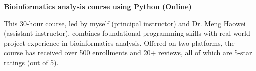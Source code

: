 \textbf{\href{https://www.bioinfo.info/p/t_pc/goods_pc_detail/goods_detail/course_2SvfNlIVzrKfOcexHk9Nute5Bhd}{Bioinformatics analysis course using Python (Online)}}

This 30-hour course, led by myself (principal instructor) and Dr. Meng Haowei (assistant instructor), 
combines foundational programming skills with real-world project experience in bioinformatics analysis. 
Offered on two platforms, the course has received over 500 enrollments and 20+ reviews, 
all of which are 5-star ratings (out of 5).